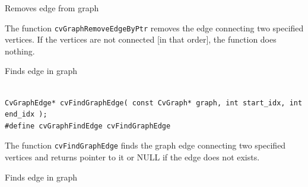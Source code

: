 \label{GraphRemoveEdgeByPtr}

Removes edge from graph


\begin{description}
\end{description}

The function \texttt{cvGraphRemoveEdgeByPtr} removes the edge connecting two specified vertices. If the vertices are not connected [in that order], the function does nothing.

\label{FindGraphEdge}

Finds edge in graph

\begin{lstlisting}

CvGraphEdge* cvFindGraphEdge( const CvGraph* graph, int start_idx, int end_idx );
#define cvGraphFindEdge cvFindGraphEdge

\end{lstlisting}

\begin{description}
\end{description}

The function \texttt{cvFindGraphEdge} finds the graph edge connecting two specified vertices and returns pointer to it or NULL if the edge does not exists.

\label{FindGraphEdgeByPtr}

Finds edge in graph


